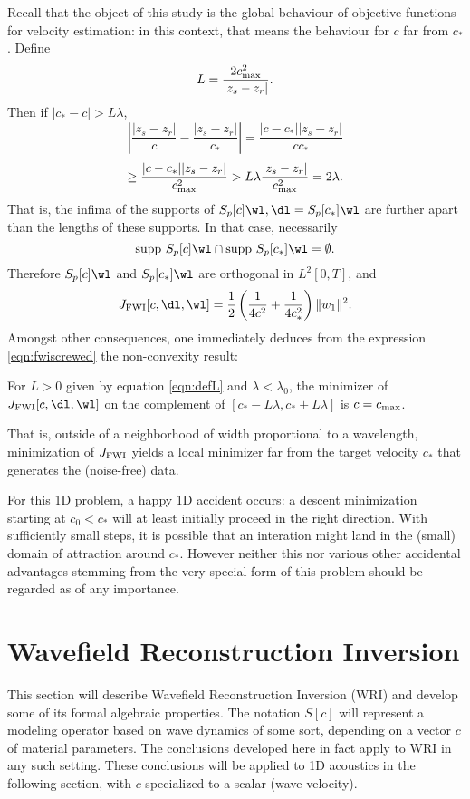 Recall that the object of this study is the global behaviour of
objective functions for velocity estimation: in this context, that
means the behaviour for $c$ far from $c_*$. Define
\begin{equation}
  \label{eqn:defL}
  L = \frac{2 c_{\rm max}^2}{|z_s-z_r|}.
\end{equation}
Then if $|c_*-c| > L\lambda$,
\[
  \left|\frac{|z_s-z_r|}{c}-\frac{|z_s-z_r|}{c_*}\right|
  =\frac{|c-c_*||z_s-z_r|}{cc_*} 
\]
\[
\ge \frac{|c-c_*||z_s-z_r|}{c_{\rm max}^2} > L\lambda
\frac{|z_s-z_r|}{c_{\rm max}^2} = 2\lambda.
\]
That is, the infima of the supports of $S_p[c]\wl, \dl=S_p[c_*]\wl$
are further apart than the lengths of these supports. In that case,
necessarily
\[
  \mbox{supp }S_p[c]\wl \cap \mbox{supp }S_p[c_*]\wl = \emptyset.
\]
Therefore $S_p[c]\wl$ and $S_p[c_*]\wl$ are orthogonal in $L^2[0,T]$,
and
\begin{equation}
  \label{eqn:fwiscrewed}
   J_{\rm FWI}[c,\dl,\wl]  =
  \frac{1}{2}\left(\frac{1}{4c^2}+\frac{1}{4c_*^2}\right)\|w_1\|^2.
\end{equation}
Amongst other consequences, one immediately deduces from the
expression \ref{eqn:fwiscrewed} the non-convexity result:

\begin{theorem}
  \label{thm:thm1}
  For $L>0$ given by equation \ref{eqn:defL} and $\lambda <
  \lambda_0$, the minimizer of $J_{\rm FWI}[c,\dl,\wl]$ on the
  complement of $[c_*-L\lambda, c_*+L\lambda]$ is $c=c_{\rm max}$.
\end{theorem}

That is, outside of a neighborhood of width proportional to a
wavelength, minimization of $J_{\rm FWI}$ yields a local minimizer far from
the target velocity $c_*$ that generates the (noise-free) data.

For this 1D problem, a happy 1D accident occurs: a descent
minimization starting at $c_0 < c_*$ will at least initially proceed
in the right direction. With sufficiently small steps, it is possible
that an interation might land in the (small) domain of attraction
around $c_*$. However neither this nor various other accidental
advantages stemming from the very special form of this problem should
be regarded as of any importance.
 
\section{Wavefield Reconstruction Inversion}
This section will describe Wavefield Reconstruction Inversion (WRI)
and develop some of its formal algebraic properties. The notation
$S[c]$ will represent a modeling operator based on wave dynamics of
some sort, depending on a vector $c$ of material parameters. The
conclusions developed here in fact apply to WRI in any such
setting. These conclusions will be applied to 1D acoustics in the
following section, with $c$ specialized to a scalar (wave velocity).

